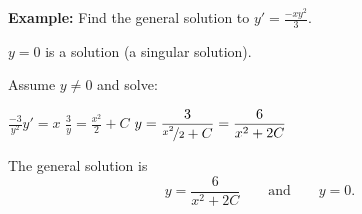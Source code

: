 \documentclass[10pt,aspectratio=169]{beamer}
\begin{document}
\begin{frame}

\textbf{Example:}
Find the general solution to $y' = \frac{-xy^2}{3}$.

\medskip
\pause

$y=0$ is a solution (a singular solution).

\medskip
\pause

Assume $y \neq 0$ and solve:

\medskip
\pause

\quad
$\displaystyle
\frac{-3}{y^2} y'  = x$
\pause
\wthus
$\displaystyle
\frac{3}{y} = \frac{x^2}{2} + C$
\pause
\wthus
$\displaystyle
y = \frac{3}{\nicefrac{x^2}{2} + C}
= \frac{6}{x^2 + 2C}
$

\medskip
\pause

The general solution is
\[
y = \frac{6}{x^2 + 2C} \qquad \text{and} \qquad y=0 .
\]

\end{frame}
\end{document}
